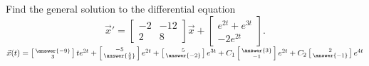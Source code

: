 \documentclass{ximera}
\begin{document}
\begin{exercise}
    Find the general solution to the differential equation
    \begin{equation*}
        {\vec{x}}' = \begin{bmatrix} -2 & -12 \\ 2 & 8 \end{bmatrix} \vec{x} + \begin{bmatrix} e^{2t} + e^{3t} \\ -2e^{2t} \end{bmatrix}. 
    \end{equation*}
    $\vec{x}(t) = \left[\begin{smallmatrix} \answer{-9} \\ 3 \end{smallmatrix}\right]te^{2t} + \left[\begin{smallmatrix} -5 \\ \answer{\frac{5}{2}} \end{smallmatrix}\right]e^{2t} + \left[\begin{smallmatrix} 5 \\ \answer{-2} \end{smallmatrix}\right]e^{3t} + C_1\left[\begin{smallmatrix} \answer{3} \\ -1 \end{smallmatrix}\right]e^{2t} + C_2\left[\begin{smallmatrix} 2 \\ \answer{-1} \end{smallmatrix}\right]e^{4t}$
\end{exercise}
\end{document}
